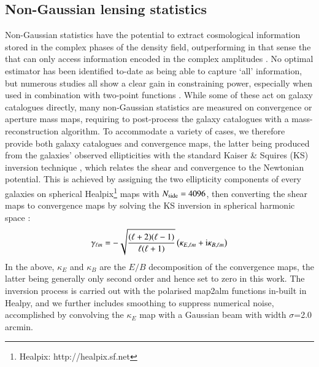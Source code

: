  
\subsection{Non-Gaussian lensing statistics}
\label{subsec:beyond-2pt}

Non-Gaussian statistics have the potential to extract cosmological information stored in the complex phases of the density field, outperforming in that sense the \gtwopcf that can only access information encoded in the complex amplitudes \citep{2002MNRAS.337..488C}.
No optimal estimator has been identified to-date as being able to capture `all' information, but numerous studies all show a clear gain in constraining power, especially when used in combination with two-point functions \citep{Fu2014, Gruen2017, HD21, DESY3_Zuercher, HSCY1_peaks_sims, KiDS1000_Burger, KiDS1000_Map3}.
While some of these act on galaxy catalogues directly, many non-Gaussian statistics are measured on convergence or aperture mass maps, requiring to post-process the galaxy catalogues with a mass-reconstruction algorithm.
To accommodate a variety of cases, we therefore provide both galaxy catalogues and convergence maps, the latter being  produced from the galaxies' observed ellipticities with the standard Kaiser \& Squires (KS)  inversion technique \citep{KaiserSquires}, which relates the shear and convergence to the Newtonian potential. This is achieved by assigning the two ellipticity components of every galaxies on spherical {\sc Healpix}\footnote{{\sc Healpix}: http://healpix.sf.net}  maps \citep{healpix} with $N_{\rm side}=4096$, then converting the shear maps to convergence maps by solving  the KS inversion in spherical harmonic space \citep[][see their equation 10]{Gatti20}:
\begin{eqnarray}
\gamma_{\ell m} = - \sqrt{\frac{(\ell+2)(\ell - 1)}{\ell(\ell+1)}}\left( \kappa_{E,\ell m} + {\rm i} \kappa_{B,\ell m} \right)
\label{eq:KS}
\end{eqnarray}
In the above, $\kappa_{E}$ and $\kappa_{B}$ are the $E/B$ decomposition of the convergence maps, the latter being generally only second order and hence set to zero in this work. 
The inversion process is carried out with the polarised  {\sc map2alm} functions  in-built in {\sc Healpy}, and we further includes smoothing to suppress numerical noise, accomplished by convolving the $\kappa_E$ map with  a Gaussian beam with width $\sigma$=2.0 arcmin.

